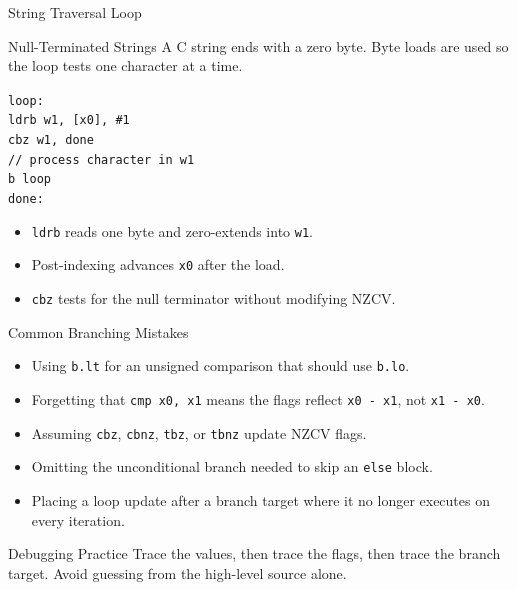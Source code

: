\documentclass[aspectratio=169,11pt,t]{beamer}
\newcommand{\code}[1]{\texttt{#1}}
\begin{document}
\begin{frame}{String Traversal Loop}
\begin{block}{Null-Terminated Strings}
A C string ends with a zero byte. Byte loads are used so the loop tests one character at a time.
\end{block}
\vspace{0.15cm}
\small
\hspace{3.0cm}\code{loop:}\\[0.08cm]
\hspace{3.5cm}\code{ldrb w1, [x0], \#1}\\[0.08cm]
\hspace{3.5cm}\code{cbz w1, done}\\[0.08cm]
\hspace{3.5cm}\code{// process character in w1}\\[0.08cm]
\hspace{3.5cm}\code{b loop}\\[0.08cm]
\hspace{3.0cm}\code{done:}
\vspace{0.15cm}
\begin{itemize}
\item \code{ldrb} reads one byte and zero-extends into \code{w1}.
\item Post-indexing advances \code{x0} after the load.
\item \code{cbz} tests for the null terminator without modifying NZCV.
\end{itemize}
\end{frame}




\begin{frame}{Common Branching Mistakes}
\begin{itemize}
\item Using \code{b.lt} for an unsigned comparison that should use \code{b.lo}.
\item Forgetting that \code{cmp x0, x1} means the flags reflect \code{x0 - x1}, not \code{x1 - x0}.
\item Assuming \code{cbz}, \code{cbnz}, \code{tbz}, or \code{tbnz} update NZCV flags.
\item Omitting the unconditional branch needed to skip an \code{else} block.
\item Placing a loop update after a branch target where it no longer executes on every iteration.
\end{itemize}
\vspace{0.15cm}
\begin{block}{Debugging Practice}
Trace the values, then trace the flags, then trace the branch target. Avoid guessing from the high-level source alone.
\end{block}
\end{frame}
\end{document}
